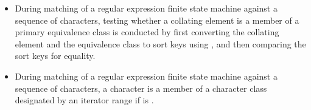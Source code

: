 \begin{itemize}
\item During matching of a regular expression finite state machine against a sequence of
characters, testing whether a collating element is a member of a primary equivalence
class is conducted by first converting the collating element and the equivalence
class to sort keys using , and then comparing the sort
keys for equality.
%
%

\item During matching of a regular expression finite state machine against a sequence
of characters, a character  is a member of a character class designated by an
iterator range  if
 is .
%
%
\end{itemize}
